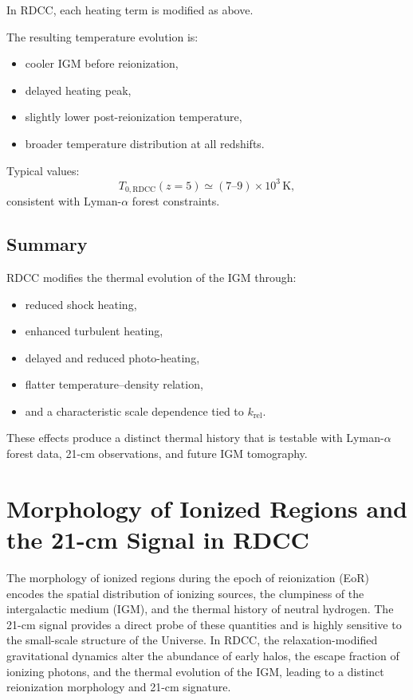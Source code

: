 \documentclass[11pt,a4paper]{article}
\begin{document}
In RDCC, each heating term is modified as above.

The resulting temperature evolution is:
\begin{itemize}
\item cooler IGM before reionization,
\item delayed heating peak,
\item slightly lower post-reionization temperature,
\item broader temperature distribution at all redshifts.
\end{itemize}

Typical values:
\begin{equation}
T_{0,\mathrm{RDCC}}(z=5)
\simeq
(7\text{--}9)\times 10^{3}\,\mathrm{K},
\end{equation}
consistent with Lyman-$\alpha$ forest constraints.

\subsection{Summary}

RDCC modifies the thermal evolution of the IGM through:
\begin{itemize}
\item reduced shock heating,
\item enhanced turbulent heating,
\item delayed and reduced photo-heating,
\item flatter temperature–density relation,
\item and a characteristic scale dependence tied to $k_{\mathrm{rel}}$.
\end{itemize}

These effects produce a distinct thermal history that is testable with Lyman-$\alpha$ forest
data, 21-cm observations, and future IGM tomography.


\section{Morphology of Ionized Regions and the 21-cm Signal in RDCC}

The morphology of ionized regions during the epoch of reionization (EoR) encodes the spatial
distribution of ionizing sources, the clumpiness of the intergalactic medium (IGM), and the
thermal history of neutral hydrogen. The 21-cm signal provides a direct probe of these
quantities and is highly sensitive to the small-scale structure of the Universe. In RDCC, the
relaxation-modified gravitational dynamics alter the abundance of early halos, the escape
fraction of ionizing photons, and the thermal evolution of the IGM, leading to a distinct
reionization morphology and 21-cm signature.
\end{document}
